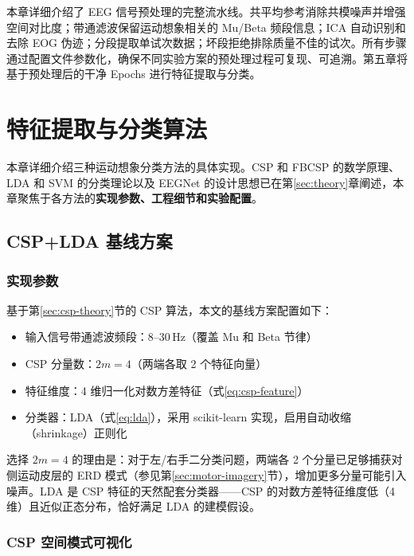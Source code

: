 本章详细介绍了 EEG 信号预处理的完整流水线。共平均参考消除共模噪声并增强空间对比度；带通滤波保留运动想象相关的 Mu/Beta 频段信息；ICA 自动识别和去除 EOG 伪迹；分段提取单试次数据；坏段拒绝排除质量不佳的试次。所有步骤通过配置文件参数化，确保不同实验方案的预处理过程可复现、可追溯。第五章将基于预处理后的干净 Epochs 进行特征提取与分类。

\section{特征提取与分类算法}

本章详细介绍三种运动想象分类方法的具体实现。CSP 和 FBCSP 的数学原理、LDA 和 SVM 的分类理论以及 EEGNet 的设计思想已在第\ref{sec:theory}章阐述，本章聚焦于各方法的\textbf{实现参数、工程细节和实验配置}。

\subsection{CSP+LDA 基线方案}

\subsubsection{实现参数}

基于第\ref{sec:csp-theory}节的 CSP 算法，本文的基线方案配置如下：

\begin{itemize}[leftmargin=2em]
	\item 输入信号带通滤波频段：8--30\,Hz（覆盖 Mu 和 Beta 节律）
	\item CSP 分量数：$2m = 4$（两端各取 2 个特征向量）
	\item 特征维度：4 维归一化对数方差特征（式\ref{eq:csp-feature}）
	\item 分类器：LDA（式\ref{eq:lda}），采用 scikit-learn 实现，启用自动收缩（shrinkage）正则化
\end{itemize}

选择 $2m = 4$ 的理由是：对于左/右手二分类问题，两端各 2 个分量已足够捕获对侧运动皮层的 ERD 模式（参见第\ref{sec:motor-imagery}节），增加更多分量可能引入噪声。LDA 是 CSP 特征的天然配套分类器——CSP 的对数方差特征维度低（4 维）且近似正态分布，恰好满足 LDA 的建模假设。

\subsubsection{CSP 空间模式可视化}

